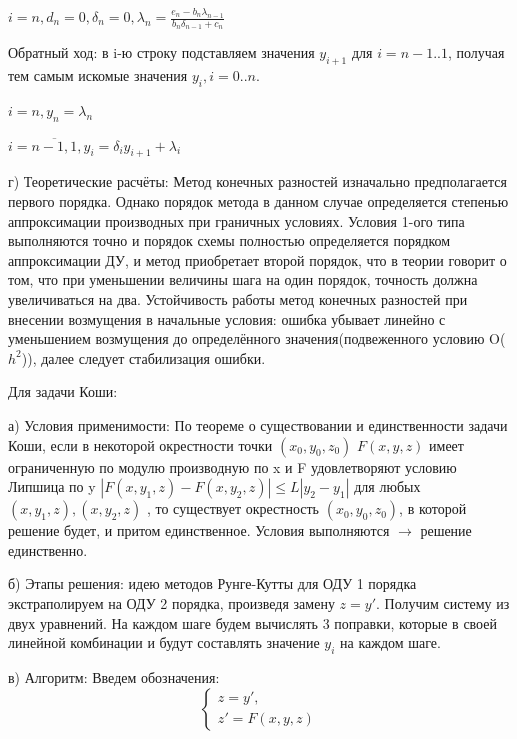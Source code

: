 \documentclass{article}
\begin{document}
	$i = n, d_n = 0, \delta_n = 0, \lambda_n = \frac{e_n-b_n\lambda_{n-1}}{b_n\delta_{n-1}+ c_n}$
	
	\hspace{3mm} Обратный ход: в i-ю строку подставляем значения $y_{i+1}$ для $i = n-1..1$, получая тем самым искомые значения $y_i, i = 0..n$.\par
	
	$i = n , y_n = \lambda_n$
	
	$i = \overline{n-1,1}, y_i = \delta_iy_{i+1} + \lambda_i$
	
	г) Теоретические расчёты: Метод конечных разностей изначально предполагается первого порядка. Однако порядок метода в данном случае определяется степенью аппроксимации производных при граничных условиях. Условия 1-ого типа выполняются точно и порядок схемы полностью определяется порядком аппроксимации ДУ, и метод приобретает второй порядок, что в теории говорит о том, что при уменьшении величины шага на один порядок, точность должна увеличиваться на два. Устойчивость работы метод конечных разностей при внесении возмущения в начальные условия: ошибка убывает линейно с уменьшением возмущения до определённого значения(подвеженного условию O($h^2$)), далее следует стабилизация ошибки.\par
	
	Для задачи Коши:
	
	а) Условия применимости: По теореме о существовании и единственности задачи Коши, если в некоторой окрестности точки $(x_0,y_0,z_0)$ $F(x,y,z)$ имеет ограниченную по модулю производную по x и F удовлетворяют условию Липшица по y
	$|F(x,y_1,z)-F(x,y_2,z)| \leq L|y_2-y_1|$ для любых $(x,y_1,z), (x,y_2,z)$
	, то существует окрестность $(x_0,y_0,z_0)$, в которой решение будет, и притом единственное. Условия выполняются $\rightarrow$ решение единственно.   \par
	
	
	б) Этапы решения: идею методов Рунге-Кутты для ОДУ 1 порядка экстраполируем на ОДУ 2 порядка, произведя замену $z = y'$. Получим систему из двух уравнений. На каждом шаге будем вычислять 3 поправки, которые в своей линейной комбинации и будут составлять значение $y_i$ на каждом шаге.\par
	в) Алгоритм: Введем обозначения: 
	\begin{equation*}
		\begin{cases}
			z = y',
			\\
			z' = F(x, y, z)
		\end{cases}
	\end{equation*}
	
\end{document}
